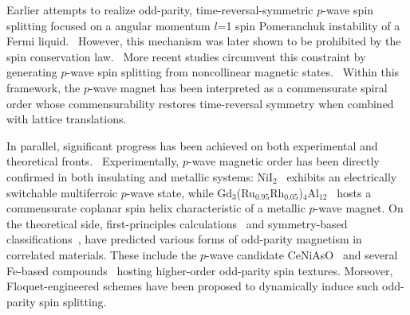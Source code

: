 \documentclass[aps,prl,twocolumn,showpacs,superscriptaddress]{revtex4-2}
\begin{document}
Earlier attempts to realize odd-parity, time-reversal-symmetric $p$-wave spin splitting focused on a angular momentum $l$=1 spin Pomeranchuk instability of a Fermi liquid.~\cite{hirsch1990spin,wu2004dynamic,varma2006helicity,wu2007fermi} However, this mechanism was later shown to be prohibited by the spin conservation law.~\cite{kiselev2017limits,wu2018conditions} More recent studies circumvent this constraint by generating $p$-wave spin splitting from noncollinear magnetic states.~\cite{hellenes2023p,chakraborty2025highly,brekke2024minimal} Within this framework, the $p$-wave magnet has been interpreted as a commensurate spiral order whose commensurability restores time-reversal symmetry when combined with lattice translations.

In parallel, significant progress has been achieved on both experimental and theoretical fronts.~\cite{brekke2024minimal,song2025electrical,yamada2025metallic,yu2025odd,chen2024enumeration,xiao2024spin,jiang2024enumeration,10.21468/SciPostPhys.18.3.109,wu2019incommensurate,lu202375,hellenes2023p,chakraborty2025highly,shishidou2018magnetic,stadel2022multiple,yu2025odd,dsouza2025odd,zhu2025floquet,huang2025light,li2025floquet,wnqs-3djt,lin2025odd,leeb2026collinear,li2026p,kim2026odd} Experimentally, $p$-wave magnetic order has been directly confirmed in both insulating and metallic systems: NiI$_2$~\cite{song2025electrical} exhibits an electrically switchable multiferroic $p$-wave state, while Gd$_3$(Ru$_{0.95}$Rh$_{0.05}$)$_4$Al$_{12}$~\cite{yamada2025metallic} hosts a commensurate coplanar spin helix characteristic of a metallic $p$-wave magnet. On the theoretical side, first-principles calculations~\cite{hellenes2023p,chakraborty2025highly,yu2025odd} and symmetry-based classifications~\cite{chen2024enumeration,xiao2024spin,jiang2024enumeration,10.21468/SciPostPhys.18.3.109}, have predicted various forms of odd-parity magnetism in correlated materials. These include the $p$-wave candidate CeNiAsO~\cite{wu2019incommensurate,lu202375,hellenes2023p,chakraborty2025highly} and several Fe-based compounds~\cite{shishidou2018magnetic,stadel2022multiple,yu2025odd,dsouza2025odd} hosting higher-order odd-parity spin textures. Moreover, Floquet-engineered schemes have been proposed to dynamically induce such odd-parity spin splitting.~\cite{zhu2025floquet,huang2025light,li2025floquet,wnqs-3djt}
\end{document}
